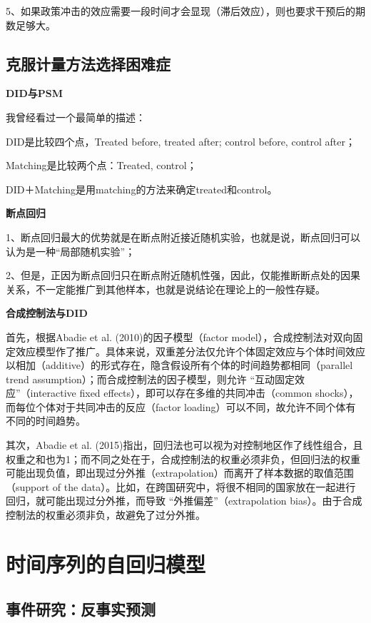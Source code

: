 \documentclass[cn,12pt,math=newtx,citestyle=gb7714-2015,bibstyle=gb7714-2015]{elegantbook}
\begin{document}
	5、如果政策冲击的效应需要一段时间才会显现（滞后效应），则也要求干预后的期数足够大。
	
	\section{克服计量方法选择困难症}
	\textbf{DID与PSM}
	
	我曾经看过一个最简单的描述：
	
	DID是比较四个点，Treated before, treated after; control before, control after；
	
	Matching是比较两个点：Treated, control；
	
	DID＋Matching是用matching的方法来确定treated和control。
	
	
	\textbf{断点回归}
	
	1、断点回归最大的优势就是在断点附近接近随机实验，也就是说，断点回归可以认为是一种“局部随机实验”；
	
	2、但是，正因为断点回归只在断点附近随机性强，因此，仅能推断断点处的因果关系，不一定能推广到其他样本，也就是说结论在理论上的一般性存疑。
	
	
	\textbf{合成控制法与DID}
	
	首先，根据Abadie et al. (2010)的因子模型（factor model），合成控制法对双向固定效应模型作了推广。具体来说，双重差分法仅允许个体固定效应与个体时间效应以相加（additive）的形式存在，隐含假设所有个体的时间趋势都相同（parallel trend assumption）；而合成控制法的因子模型，则允许 “互动固定效应”（interactive fixed effects），即可以存在多维的共同冲击（common shocks），而每位个体对于共同冲击的反应（factor loading）可以不同，故允许不同个体有不同的时间趋势。
	
	其次，Abadie et al. (2015)指出，回归法也可以视为对控制地区作了线性组合，且权重之和也为1；而不同之处在于，合成控制法的权重必须非负，但回归法的权重可能出现负值，即出现过分外推（extrapolation）而离开了样本数据的取值范围（support of the data）。比如，在跨国研究中，将很不相同的国家放在一起进行回归，就可能出现过分外推，而导致 “外推偏差”（extrapolation bias）。由于合成控制法的权重必须非负，故避免了过分外推。
	
	\chapter{时间序列的自回归模型}
	
	\section{事件研究：反事实预测}
	
\end{document}
